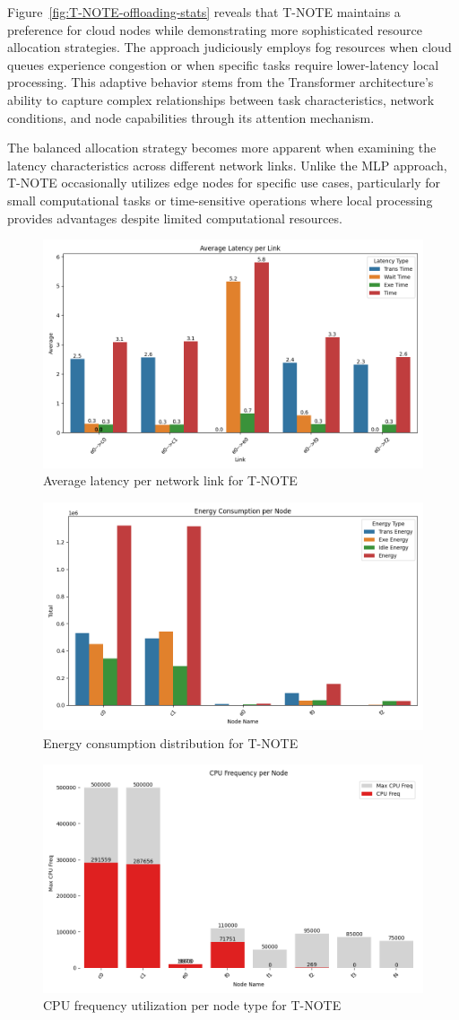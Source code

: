 \documentclass[preprint,3p,authoryear]{elsarticle}
\begin{document}
Figure~\ref{fig:T-NOTE-offloading-stats} reveals that T-NOTE maintains a preference for cloud nodes while demonstrating more sophisticated resource allocation strategies. The approach judiciously employs fog resources when cloud queues experience congestion or when specific tasks require lower-latency local processing. This adaptive behavior stems from the Transformer architecture's ability to capture complex relationships between task characteristics, network conditions, and node capabilities through its attention mechanism.

The balanced allocation strategy becomes more apparent when examining the latency characteristics across different network links. Unlike the MLP approach, T-NOTE occasionally utilizes edge nodes for specific use cases, particularly for small computational tasks or time-sensitive operations where local processing provides advantages despite limited computational resources.

\begin{figure}[H]
    \centering
    \includegraphics[width=0.5\linewidth]{figs/T-NOTE/avg_latency_per_link.png}
    \caption{Average latency per network link for T-NOTE}
    \label{fig:T-NOTE-avg-latency}
\end{figure}

\begin{figure}[H]
    \centering
    \includegraphics[width=0.5\linewidth]{figs/T-NOTE/energy_consumption_per_node.png}
    \caption{Energy consumption distribution for T-NOTE}
    \label{fig:T-NOTE-energy-consumption}
\end{figure}

\begin{figure}[H]
    \centering
    \includegraphics[width=0.5\linewidth]{figs/T-NOTE/cpu_frequency_per_node.png}
    \caption{CPU frequency utilization per node type for T-NOTE}
    \label{fig:T-NOTE-cpu-frequency}
\end{figure}
\end{document}

